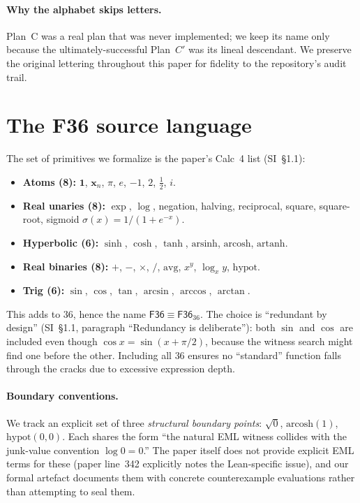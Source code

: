 \documentclass[11pt,a4paper]{article}
\newcommand{\F}{\mathsf{F36}}
\theoremstyle{plain}
\theoremstyle{definition}
\begin{document}
\paragraph{Why the alphabet skips letters.} Plan~C was a real plan
that was never implemented; we keep its name only because the
ultimately-successful Plan~$C'$ was its lineal descendant. We
preserve the original lettering throughout this paper for fidelity to
the repository's audit trail.

\section{The F36 source language}
\label{sec:f36-language}

The set of primitives we formalize is the paper's Calc~4 list
(SI~\S1.1):
\begin{itemize}[topsep=2pt, itemsep=2pt]
  \item \textbf{Atoms (8):} $\mathbf{1}$, $\mathbf{x}_n$,
    $\pi$, $e$, $-1$, $2$, $\tfrac{1}{2}$, $i$.
  \item \textbf{Real unaries (8):} $\exp$, $\log$, negation,
    halving, reciprocal, square, square-root, sigmoid
    $\sigma(x) = 1/(1 + e^{-x})$.
  \item \textbf{Hyperbolic (6):} $\sinh$, $\cosh$, $\tanh$,
    $\mathrm{arsinh}$, $\mathrm{arcosh}$, $\mathrm{artanh}$.
  \item \textbf{Real binaries (8):} $+$, $-$, $\times$, $/$,
    $\mathrm{avg}$, $x^y$, $\log_x y$, $\mathrm{hypot}$.
  \item \textbf{Trig (6):} $\sin$, $\cos$, $\tan$,
    $\arcsin$, $\arccos$, $\arctan$.
\end{itemize}
This adds to $36$, hence the name $\F\equiv\F_{36}$. The choice is
``redundant by design'' (SI~\S1.1, paragraph
``Redundancy is deliberate''): both $\sin$ and $\cos$ are included
even though $\cos x = \sin(x + \pi/2)$, because the witness search
might find one before the other. Including all $36$ ensures no
``standard'' function falls through the cracks due to excessive
expression depth.

\paragraph{Boundary conventions.} We track an explicit set of three
\emph{structural boundary points}:
$\sqrt{0}$, $\mathrm{arcosh}(1)$, $\mathrm{hypot}(0,0)$. Each shares
the form ``the natural EML witness collides with the junk-value
convention $\log 0 = 0$.'' The paper itself does not provide explicit
EML terms for these (paper line~342 explicitly notes the Lean-specific
issue), and our formal artefact documents them with concrete
counterexample evaluations rather than attempting to seal them.
\end{document}
